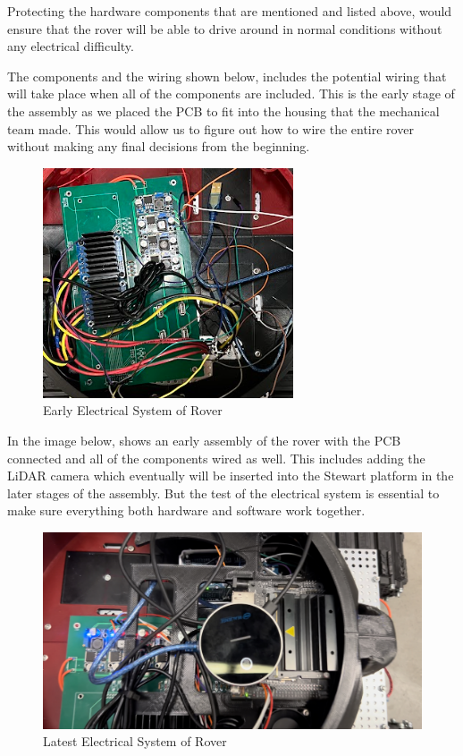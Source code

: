 \documentclass[a4paper, 10pt]{article}
\begin{document}
Protecting the hardware components that are mentioned and listed above, would ensure that the rover will be able to drive around in normal conditions without any electrical difficulty. 

The components and the wiring shown below, includes the potential wiring that will take place when all of the components are included. This is the early stage of the assembly as we placed the PCB to fit into the housing that the mechanical team made. This would allow us to figure out how to wire the entire rover without making any final decisions from the beginning.
 
 		\begin{figure} [h]
			\centering
			\includegraphics[scale=1.25]{Photos/Rover PCB (Wired)}
			\caption{Early Electrical System of Rover}
		\end{figure}

In the image below, shows an early assembly of the rover with the PCB connected and all of the components wired as well. This includes adding the LiDAR camera which eventually will be inserted into the Stewart platform in the later stages of the assembly. But the test of the electrical system is essential to make sure everything both hardware and software work together.

\begin{figure} [h]
			\centering
			\includegraphics[scale=0.25]{Photos/Rover PCB (Assembled)}
			\caption{Latest Electrical System of Rover}
		\end{figure}
 		
\end{document}
